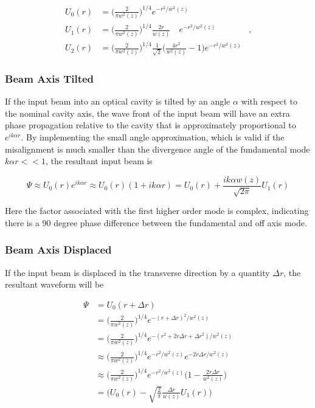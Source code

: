 		\begin{equation}
		\label{Gauss1D}
		\begin{aligned}
				U_{0}(r) & =	\bigg( \frac{2}{\pi w^2(z)} \bigg)^{1/4}  e^{-r^2/w^2(z)}		&
		\\		U_{1}(r) &	=	\bigg( \frac{2}{\pi w^2(z)} \bigg)^{1/4}  \frac{2r}{w(z)} \quad e^{-r^2/w^2(z)}&,
		\\	 	U_{2}(r) &	=	\bigg( \frac{2}{\pi w^2(z)} \bigg)^{1/4}  \frac{1}{\sqrt{2}} \bigg( \frac{4r^2}{w^2(z)} - 1 \bigg)   e^{-r^2/w^2(z)}
		\end{aligned}
		\end{equation}
		
		\subsubsection{Beam Axis Tilted}
		If the input beam into an optical cavity is tilted by an angle $\alpha$ with respect to the nominal cavity axis, the wave front of the input beam will have an extra phase propagation relative to the cavity that is approximately proportional to $e^{ik \alpha r}$.  By implementing the small angle approximation, which is valid if the misalignment is much smaller than the divergence angle of the fundamental mode $k \alpha r << 1$, the resultant input beam is
		
		\begin{equation}
		\Psi \approx U_{0}(r) e^{ik \alpha r} \approx U_{0}(r) ( 1 + ik \alpha r ) =  U_{0}(r) + \frac{ik \alpha w(z)}{\sqrt{2\pi}} U_{1}(r)
		\end{equation}
		
		Here the factor associated with the first higher order mode is complex, indicating there is a 90 degree phase difference between the fundamental and off axis mode. 
		\subsubsection{Beam Axis Displaced}
		If the input beam is displaced in the transverse direction by a quantity $\Delta r$, the resultant waveform will be
		
		\begin{equation}
		\begin{aligned}
			\Psi 	&=  		U_{0}(r + \Delta r	) 
			\\		&= 			\bigg( \frac{2}{\pi w^2(z)} \bigg)^{1/4}  e^{-(r+\Delta r)^2/w^2(z)}
			\\		&= 			\bigg( \frac{2}{\pi w^2(z)} \bigg)^{1/4}  e^{-(r^2 + 2r \Delta r  + \Delta r^2)/w^2(z)}
			\\		&\approx 	\bigg( \frac{2}{\pi w^2(z)} \bigg)^{1/4}  e^{-r^2/w^2(z)} e^{-2r \Delta r/w^2(z)}
			\\		&\approx 	\bigg( \frac{2}{\pi w^2(z)} \bigg)^{1/4}  e^{-r^2/w^2(z)} \bigg(1 - \frac{2r \Delta r}{w^2(z)} \bigg)
			\\		&=			\bigg( U_0(r) - \sqrt{\frac{2}{\pi}} \frac{\Delta r }{w(z)} U_1(r)	 \bigg)
		\end{aligned}
		\end{equation} 
		

